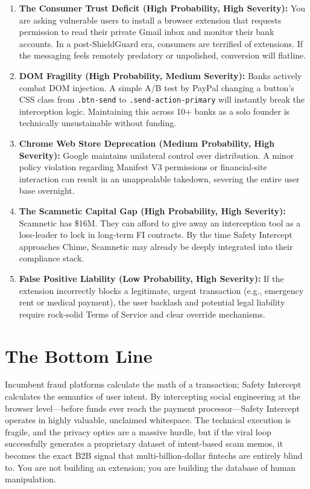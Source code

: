 \documentclass[12pt, letterpaper]{article}
\begin{document}
\begin{enumerate}
    \item \textbf{The Consumer Trust Deficit (High Probability, High Severity):} You are asking vulnerable users to install a browser extension that requests permission to read their private Gmail inbox and monitor their bank accounts. In a post-ShieldGuard era, consumers are terrified of extensions. If the messaging feels remotely predatory or unpolished, conversion will flatline.
    \item \textbf{DOM Fragility (High Probability, Medium Severity):} Banks actively combat DOM injection. A simple A/B test by PayPal changing a button's CSS class from \texttt{.btn-send} to \texttt{.send-action-primary} will instantly break the interception logic. Maintaining this across 10+ banks as a solo founder is technically unsustainable without funding.
    \item \textbf{Chrome Web Store Deprecation (Medium Probability, High Severity):} Google maintains unilateral control over distribution. A minor policy violation regarding Manifest V3 permissions or financial-site interaction can result in an unappealable takedown, severing the entire user base overnight.
    \item \textbf{The Scamnetic Capital Gap (High Probability, High Severity):} Scamnetic has \$16M. They can afford to give away an interception tool as a loss-leader to lock in long-term FI contracts. By the time Safety Intercept approaches Chime, Scamnetic may already be deeply integrated into their compliance stack.
    \item \textbf{False Positive Liability (Low Probability, High Severity):} If the extension incorrectly blocks a legitimate, urgent transaction (e.g., emergency rent or medical payment), the user backlash and potential legal liability require rock-solid Terms of Service and clear override mechanisms.
\end{enumerate}

\newpage
\section{The Bottom Line}

Incumbent fraud platforms calculate the math of a transaction; Safety Intercept calculates the semantics of user intent. By intercepting social engineering at the browser level—before funds ever reach the payment processor—Safety Intercept operates in highly valuable, unclaimed whitespace. The technical execution is fragile, and the privacy optics are a massive hurdle, but if the viral loop successfully generates a proprietary dataset of intent-based scam memos, it becomes the exact B2B signal that multi-billion-dollar fintechs are entirely blind to. You are not building an extension; you are building the database of human manipulation.
\end{document}
